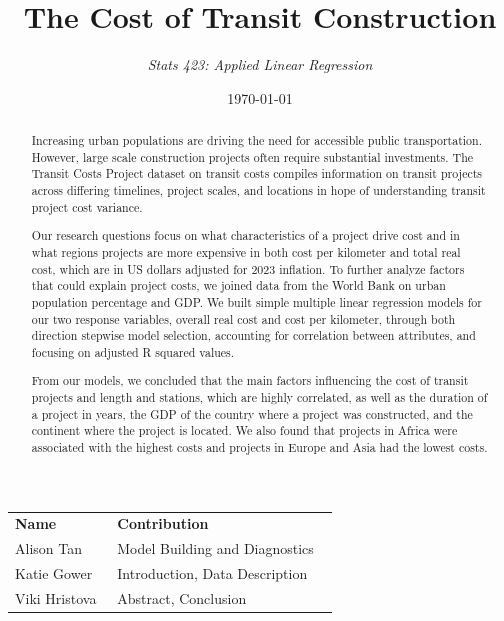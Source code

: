 \documentclass[12pt]{article}
\title{\textbf{The Cost of Transit Construction}}
\author{
    \vspace{0.3cm}
    \textit{Stats 423: Applied Linear Regression}
}
\date{\today}
\begin{document}
\maketitle

\begin{table}[h]
\centering
\begin{tabular}{p{0.3\linewidth} p{0.65\linewidth}}
\textbf{Name} & \textbf{Contribution} \\[0.5em]

Alison Tan & Model Building and Diagnostics \\[0em]

Katie Gower & Introduction, Data Description \\[0em]

Viki Hristova & Abstract, Conclusion \\[0em]


\end{tabular}
\end{table}


\begin{abstract}
\noindent Increasing urban populations are driving the need for accessible public transportation. However, large scale construction projects often require substantial investments. The Transit Costs Project dataset on transit costs compiles information on transit projects across differing timelines, project scales, and locations in hope of understanding transit project cost variance. 

Our research questions focus on what characteristics of a project drive cost and in what regions projects are more expensive in both cost per kilometer and total real cost, which are in US dollars adjusted for 2023 inflation. To further analyze factors that could explain project costs, we joined data from the World Bank on urban population percentage and GDP. We built simple multiple linear regression models for our two response variables, overall real cost and cost per kilometer, through both direction stepwise model selection, accounting for correlation between attributes, and focusing on adjusted R squared values. 

From our models, we concluded that the main factors influencing the cost of transit projects and length and stations, which are highly correlated, as well as the duration of a project in years, the GDP of the country where a project was constructed, and the continent where the project is located. We also found that projects in Africa were associated with the highest costs and projects in Europe and Asia had the lowest costs.
\end{abstract}
\end{document}
